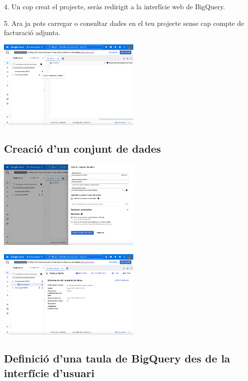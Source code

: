 \documentclass[12pt,longbibliography]{article}
\theoremstyle{definition}
\theoremstyle{remark}
\begin{document}
4. Un cop creat el projecte, seràs redirigit a la interfície web de BigQuery.

5. Ara ja pots carregar o consultar dades en el teu projecte sense cap compte de
facturació adjunta.

\begin{center}
\includegraphics[width=7cm]{bq3}
\end{center}

\subsection{Creació d'un conjunt de dades}

\begin{center}
\includegraphics[width=7cm]{bq4}
\end{center}

\begin{center}
\includegraphics[width=7cm]{bq5}
\end{center}

\subsection{Definició d'una taula de BigQuery des de la interfície d'usuari}
\end{document}
